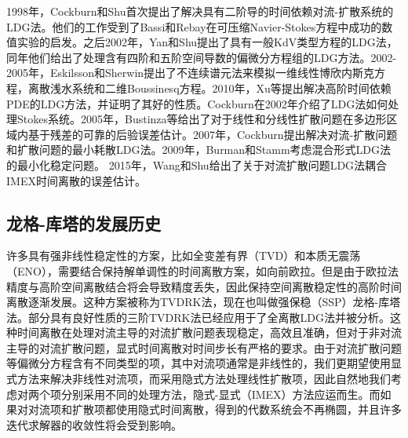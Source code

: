 1998年，Cockburn和Shu首次提出了解决具有二阶导的时间依赖对流-扩散系统的LDG法\cite{cockburn1998local}。他们的工作受到了Bassi和Rebay在可压缩Navier-Stokes方程中成功的数值实验的启发\cite{bassi1997high}。之后2002年，Yan和Shu提出了具有一般KdV类型方程的LDG法\cite{yan2002localb}，同年他们给出了处理含有四阶和五阶空间导数的偏微分方程组的LDG方法\cite{yan2002local}。2002-2005年，Eskilsson和Sherwin提出了不连续谱元法来模拟一维线性博欣内斯克方程，离散浅水系统和二维Boussinesq方程\cite{eskilsson2002discontinuous,eskilsson2005discontinuous,eskilsson2005discontinuousb}。2010年，Xu等提出解决高阶时间依赖PDE的LDG方法\cite{xu2010local}，并证明了其好的性质。Cockburn在2002年介绍了LDG法如何处理Stokes系统\cite{cockburn2002local}。2005年，Bustinza等给出了对于线性和分线性扩散问题在多边形区域内基于残差的可靠的后验误差估计\cite{bustinza2005posteriori}。2007年，Cockburn提出解决对流-扩散问题和扩散问题的最小耗散LDG法\cite{cockburn2007analysis}。2009年，Burman和Stamm考虑混合形式LDG法的最小化稳定问题。
2015年，Wang和Shu给出了关于对流扩散问题LDG法耦合IMEX时间离散的误差估计\cite{wang2015stability}。

\subsection{龙格-库塔的发展历史}
许多具有强非线性稳定性的方案，比如全变差有界（TVD）和本质无震荡（ENO），需要结合保持解单调性的时间离散方案，如向前欧拉。但是由于欧拉法精度与高阶空间离散结合将会导致精度丢失，因此保持空间离散稳定性的高阶时间离散逐渐发展\cite{shu1988efficient}。这种方案被称为TVDRK法，现在也叫做强保稳（SSP）龙格-库塔法。部分具有良好性质的三阶TVDRK法\cite{shu2007efficient}已经应用于了全离散LDG法并被分析\cite{wang2013errora}。这种时间离散在处理对流主导的对流扩散问题表现稳定，高效且准确，但对于非对流主导的对流扩散问题，显式时间离散对时间步长有严格的要求\cite{shu2007efficient}。由于对流扩散问题等偏微分方程含有不同类型的项，其中对流项通常是非线性的，我们更期望使用显式方法来解决非线性对流项，而采用隐式方法处理线性扩散项，因此自然地我们考虑对两个项分别采用不同的处理方法，隐式-显式（IMEX）方法应运而生\cite{ascher1997implicitexplicita}。而如果对对流项和扩散项都使用隐式时间离散，得到的代数系统会不再椭圆，并且许多迭代求解器的收敛性将会受到影响。

